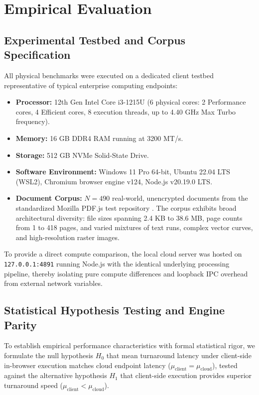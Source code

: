 \documentclass[journal]{IEEEtran}
\begin{document}
\section{Empirical Evaluation}

\subsection{Experimental Testbed and Corpus Specification}
All physical benchmarks were executed on a dedicated client testbed representative of typical enterprise computing endpoints:
\begin{itemize}[leftmargin=12pt, topsep=2pt, itemsep=1pt]
\item \textbf{Processor:} 12th Gen Intel Core i3-1215U (6 physical cores: 2 Performance cores, 4 Efficient cores, 8 execution threads, up to 4.40 GHz Max Turbo frequency).
\item \textbf{Memory:} 16 GB DDR4 RAM running at 3200 MT/s.
\item \textbf{Storage:} 512 GB NVMe Solid-State Drive.
\item \textbf{Software Environment:} Windows 11 Pro 64-bit, Ubuntu 22.04 LTS (WSL2), Chromium browser engine v124, Node.js v20.19.0 LTS.
\item \textbf{Document Corpus:} $N=490$ real-world, unencrypted documents from the standardized Mozilla PDF.js test repository \cite{mozilla2024corpus}. The corpus exhibits broad architectural diversity: file sizes spanning 2.4 KB to 38.6 MB, page counts from 1 to 418 pages, and varied mixtures of text runs, complex vector curves, and high-resolution raster images.
\end{itemize}
To provide a direct compute comparison, the local cloud server was hosted on \texttt{127.0.0.1:4891} running Node.js with the identical underlying processing pipeline, thereby isolating pure compute differences and loopback IPC overhead from external network variables.

\subsection{Statistical Hypothesis Testing and Engine Parity}
To establish empirical performance characteristics with formal statistical rigor, we formulate the null hypothesis $H_0$ that mean turnaround latency under client-side in-browser execution matches cloud endpoint latency ($\mu_{\text{client}} = \mu_{\text{cloud}}$), tested against the alternative hypothesis $H_1$ that client-side execution provides superior turnaround speed ($\mu_{\text{client}} < \mu_{\text{cloud}}$).
\end{document}
